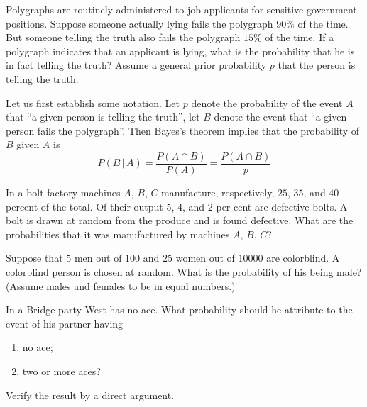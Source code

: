 \begin{problem}
   Polygraphs are routinely administered to job
  applicants for sensitive government positions. Suppose someone actually
  lying fails the polygraph \(90\%\) of the time. But someone telling the
  truth also fails the polygraph \(15\%\) of the time. If a polygraph
  indicates that an applicant is lying, what is the probability that he is
  in fact telling the truth? Assume a general prior probability \(p\) that
  the person is telling the truth.
\end{problem}
\begin{solution*}
  Let us first establish some notation. Let \(p\) denote the probability of
  the event \(A\) that ``a given person is telling the truth'', let \(B\)
  denote the event that ``a given person fails the polygraph''. Then
  Bayes's theorem implies that the probability of \(B\) given \(A\) is
  \[
    P(B\,|\,A)=\frac{P(A\cap B)}{P(A)}=\frac{P(A\cap B)}{p}
  \]
\end{solution*}

\begin{problem}[Handout 4, \# 8]
  In a bolt factory machines \(A\), \(B\), \(C\) manufacture, respectively,
  \(25\), \(35\), and \(40\) percent of the total. Of their output \(5\),
  \(4\), and \(2\) per cent are defective bolts. A bolt is drawn at random
  from the produce and is found defective. What are the probabilities that
  it was manufactured by machines \(A\), \(B\), \(C\)?
\end{problem}
\begin{solution*}
\end{solution*}

\begin{problem}[Handout 4, \# 9]
  Suppose that \(5\) men out of \(100\) and \(25\) women out of
  \(\num{10000}\) are colorblind. A colorblind person is chosen at
  random. What is the probability of his being male? (Assume males and
  females to be in equal numbers.)
\end{problem}
\begin{solution*}
\end{solution*}

\begin{problem}
  In a Bridge party West has no ace. What probability should he attribute
  to the event of his partner having
  \begin{enumerate}[label=(\alph*),noitemsep]
  \item no ace;
  \item two or more aces?
  \end{enumerate}
  Verify the result by a direct argument.
\end{problem}
\begin{solution*}
\end{solution*}

